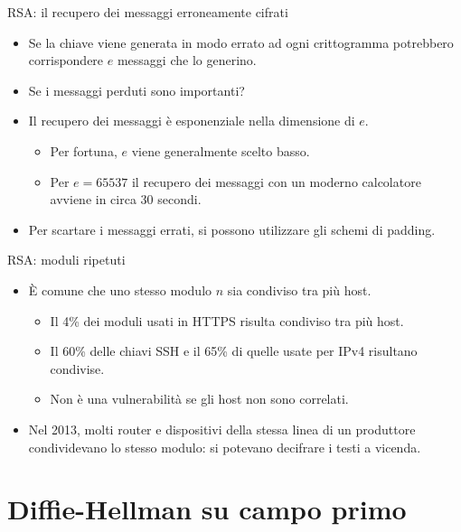 \documentclass[11pt,svgnames,smaller,aspectratio=169,italian]{beamer}
\begin{document}
\begin{frame}{RSA: il recupero dei messaggi erroneamente cifrati}
	\begin{itemize}
		\item Se la chiave viene generata in modo errato ad ogni crittogramma potrebbero corrispondere $e$ messaggi che lo generino.
		\item Se i messaggi perduti sono importanti?
		\item Il recupero dei messaggi è esponenziale nella dimensione di $e$.
			\begin{itemize}
				\item Per fortuna, $e$ viene generalmente scelto basso.
				\item Per $e = 65537$ il recupero dei messaggi con un moderno calcolatore avviene in circa 30 secondi.
			\end{itemize}
		\item Per scartare i messaggi errati, si possono utilizzare gli schemi di padding.
	\end{itemize}
\end{frame}

\begin{frame}{RSA: moduli ripetuti}
	\begin{itemize}
		\item È comune che uno stesso modulo $n$ sia condiviso tra più host.
			\begin{itemize}
				\item Il 4\% dei moduli usati in HTTPS risulta condiviso tra più host.
				\item Il 60\% delle chiavi SSH e il 65\% di quelle usate per IPv4 risultano condivise.
				\item Non è una vulnerabilità se gli host non sono correlati.
			\end{itemize}
		\item Nel 2013, molti router e dispositivi della stessa linea di un produttore condividevano lo stesso modulo: si potevano decifrare i testi a vicenda.
	\end{itemize}
\end{frame}

\section{Diffie-Hellman su campo primo}
\begin{frame}
	\sectionpage
	\centering
\end{frame}
\end{document}
